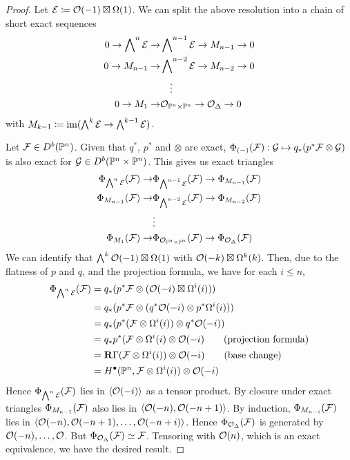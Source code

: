 \begin{proof}
    Let $\mathcal{E}\coloneqq\mathcal{O}(-1)\boxtimes\Omega(1)$.
    We can split the above resolution into a chain of short exact sequences
    \begin{align*}
        0 \to \bigwedge\nolimits^{n}\mathcal{E} \to &\bigwedge\nolimits^{n-1}\mathcal{E}\to M_{n-1}\to 0  \\
        0\to M_{n-1}\to & \bigwedge\nolimits^{n-2}\mathcal{E}\to M_{n-2}\to 0  \\
        &\quad\vdots \\
        0\to M_{1}\to &\mathcal{O}_{\mathbb{P}^{n}\times \mathbb{P}^{n}}\to\mathcal{O}_{\Delta}\to 0
    \end{align*}
    with $M_{k-1}\coloneqq\operatorname{im}(\bigwedge^{k}\mathcal{E} \to \bigwedge^{k-1}\mathcal{E})$.

    Let $\mathcal{F}\in D^b(\mathbb{P}^n)$. Given that $q^*$, $p^*$ and $\otimes$ are exact, $\Phi_{(-)}(\mathcal{F}):\mathcal{G}\mapsto q_{*}(p^{*}\mathcal{F}\otimes\mathcal{G})$ is also exact for $\mathcal{G} \in D^b(\mathbb{P}^n\times \mathbb{P}^n)$. This gives us exact triangles
    \begin{align*}
        \Phi_{\bigwedge^{n}\mathcal{E}}(\mathcal{F}) \to &\Phi_{\bigwedge^{n-1}\mathcal{E}} (\mathcal{F})\to \Phi_{M_{n-1}}(\mathcal{F})  \\
        \Phi_{M_{n-1}}(\mathcal{F})\to & \Phi_{\bigwedge^{n-2}\mathcal{E}} (\mathcal{F})\to \Phi_{M_{n-2}}(\mathcal{F})  \\
        &\vdots \\
        \Phi_{M_{1}}(\mathcal{F})\to &\Phi_{\mathcal{O}_{\mathbb{P}^n\times\mathbb{P}^n} }(\mathcal{F})\to \Phi_{\mathcal{O}_{\Delta}} (\mathcal{F})
    \end{align*}
    We can identify that $\bigwedge^{k}\mathcal{O}(-1)\boxtimes\Omega(1)$ with $\mathcal{O}(-k)\boxtimes\Omega^k(k)$. Then, due to the flatness of $p$ and $q$, and the projection formula, we have for each $i \leq n$,
    \begin{align*}
        \Phi_{\bigwedge^n\mathcal{E}}(\mathcal{F})
            &= q_*(p^*\mathcal{F}\otimes(\mathcal{O}(-i)\boxtimes\Omega^i(i))) \\
            &= q_*(p^*\mathcal{F}\otimes(q^*\mathcal{O}(-i)\otimes p^*\Omega^i(i))) \\
            &= q_*(p^*(\mathcal{F}\otimes\Omega^i(i))\otimes q^*\mathcal{O}(-i)) \\
            &= q_*p^*(\mathcal{F}\otimes\Omega^i(i)\otimes\mathcal{O}(-i)
                \qquad \text{(projection formula)} \\
            &= \operatorname{\mathbf{R}\Gamma}(\mathcal{F}\otimes\Omega^i(i))\otimes\mathcal{O}(-i)
                \qquad \text{(base change)} \\
            &= H^\bullet(\mathbb{P}^n,\mathcal{F}\otimes\Omega^i(i))\otimes\mathcal{O}(-i)
    \end{align*}
    Hence $\Phi_{\bigwedge^{n}\mathcal{E}} (\mathcal{F})$ lies in $\langle\mathcal{O}(-i)\rangle$ as a tensor product. By closure under exact triangles $\Phi_{M_{n-1}}(\mathcal{F})$ also lies in $\langle\mathcal{O}(-n),\mathcal{O}(-n+1)\rangle$. By induction, $\Phi_{M_{n-i}}(\mathcal{F})$ lies in $\langle\mathcal{O}(-n),\mathcal{O}(-n+1),\dots,\mathcal{O}(-n+i)\rangle$. Hence $\Phi_{\mathcal{O}_\Delta}(\mathcal{F})$ is generated by $\mathcal{O}(-n),\dots,\mathcal{O}$. But $\Phi_{\mathcal{O}_\Delta}(\mathcal{F})\simeq\mathcal{F}$. Tensoring with $\mathcal{O}(n)$, which is an exact equivalence, we have the desired result.
\end{proof}

